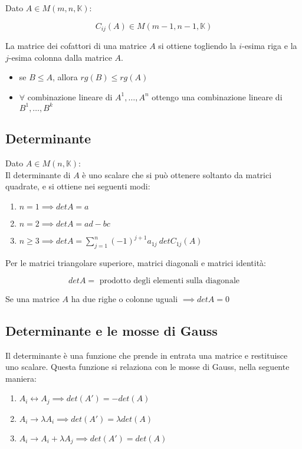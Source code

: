 \documentclass{subfiles}
\begin{document}
Dato $A \in M(m,n,\mathbb{K})$:

$$
C_{ij} (A) \in M(m-1, n-1, \mathbb{K})
$$

\noindent
La matrice dei cofattori di una matrice $A$ si ottiene togliendo la $i$-esima riga e la $j$-esima colonna dalla matrice $A$.

\begin{itemize}
    \item se $B \leq A$, allora $rg(B) \leq rg(A)$
    \item $\forall$ combinazione lineare di $A^1,  \dots, A^n$ ottengo una combinazione lineare di $B^1, \dots, B^k$
\end{itemize}

\subsection{Determinante}

Dato $A \in M(n,\mathbb{K})$:\\

\noindent
Il determinante di $A$ è uno scalare che si può ottenere soltanto da matrici quadrate, e si ottiene nei seguenti modi:

\begin{enumerate}
	\item $n = 1 \implies det A = a$
	\item $n = 2 \implies det A = ad - bc$
	\item $n \geq 3 \implies det A = \sum^{n}_{j=1} (-1)^{j+1} a_{1j} \ det C_{1j} (A)$
\end{enumerate}

\noindent
Per le matrici triangolare superiore, matrici diagonali e matrici identità:

$$
det A = \text{ prodotto degli elementi sulla diagonale}
$$

\noindent
Se una matrice $A$ ha due righe o colonne uguali $\implies det A = 0$

\subsection{Determinante e le mosse di Gauss}

Il determinante è una funzione che prende in entrata una matrice e restituisce uno scalare.
Questa funzione si relaziona con le mosse di Gauss, nella seguente maniera:

\begin{enumerate}
	\item $A_i \leftrightarrow A_j \implies det(A') = -det(A)$
	\item $A_i \rightarrow \lambda A_i \implies det(A') = \lambda det(A)$
	\item $A_i \rightarrow A_i + \lambda A_j \implies det(A') = det(A)$
\end{enumerate}
\end{document}
